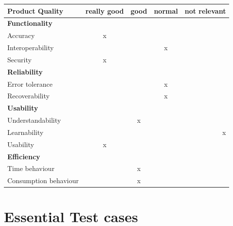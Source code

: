 \documentclass[twoside, english, draft]{Pflichtenheft}
\begin{document}
\begin{tabular}{l*{3}{c}r}
	Product Quality        & really good & good & normal & not relevant \\
	\hline
	\textbf{Functionality} &             &      &        &              \\
	Accuracy               & x           &      &        &              \\
	Interoperability       &             &      & x      &              \\
	Security               & x           &      &        &              \\
	\textbf{Reliability}   &             &      &        &              \\
	Error tolerance        &             &      & x      &              \\
	Recoverability         &             &      & x      &              \\
	\textbf{Usability}     &             &      &        &              \\
	Understandability      &             & x    &        &              \\
	Learnability           &             &      &        & x            \\
	Usability              & x           &      &        &              \\

	\textbf{Efficiency}    &             &      &        &              \\
	Time behaviour         &             & x    &        &              \\
	Consumption behaviour  &             & x    &        &              \\
\end{tabular}

\section{Essential Test cases}
\end{document}
